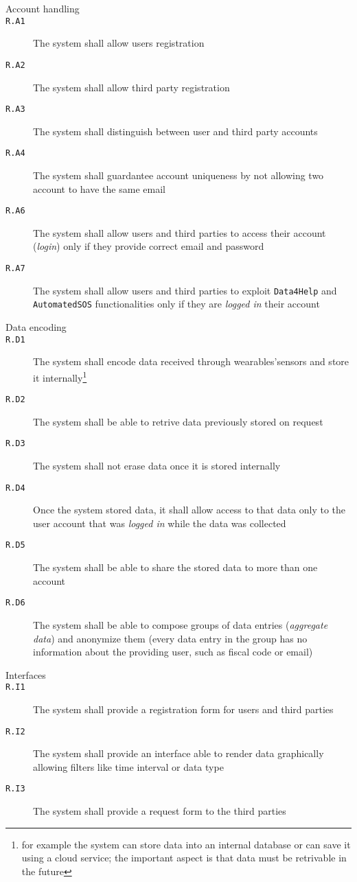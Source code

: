     \begin{description}
      \item[Account handling]
      \item[\texttt{R.A1}] The system shall allow users registration
      \item[\texttt{R.A2}] The system shall allow third party registration
      \item[\texttt{R.A3}] The system shall distinguish between user and third party accounts
      \item[\texttt{R.A4}] The system shall guardantee account uniqueness by not allowing two account to have the same email
      \item[\texttt{R.A6}] The system shall allow users and third parties to access their account (\textit{login}) only if they provide correct email and password
      \item[\texttt{R.A7}] The system shall allow users and third parties to exploit \texttt{Data4Help} and \texttt{AutomatedSOS} functionalities only if they are \textit{logged in} their account

      \item[Data encoding]
      \item[\texttt{R.D1}] The system shall encode data received through wearables'sensors and store it internally\footnote{for example the system can store data into an internal database or can save it using a cloud service; the important aspect is that data must be retrivable in the future}
      \item[\texttt{R.D2}] The system shall be able to retrive data previously stored on request
      \item[\texttt{R.D3}] The system shall not erase data once it is stored internally
      \item[\texttt{R.D4}] Once the system stored data, it shall allow access to that data only to the user account that was \textit{logged in} while the data was collected
      \item[\texttt{R.D5}] The system shall be able to share the stored data to more than one account
      \item[\texttt{R.D6}] The system shall be able to compose groups of data entries (\textit{aggregate data}) and anonymize them (every data entry in the group has no information about the providing user, such as fiscal code or email)

      \item[Interfaces]
      \item[\texttt{R.I1}] The system shall provide a registration form for users and third parties
      \item[\texttt{R.I2}] The system shall provide an interface able to render data graphically allowing filters like time interval or data type
      \item[\texttt{R.I3}] The system shall provide a request form to the third parties


\end{description}
